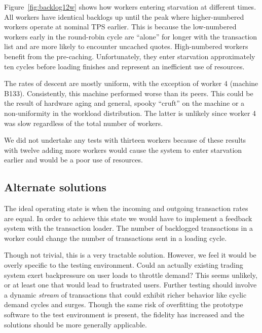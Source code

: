 Figure~\ref{fig:backlog12w} shows how workers entering starvation at different times.
All workers have identical backlogs up until the peak where higher-numbered workers operate at nominal TPS earlier.
This is because the low-numbered workers early in the round-robin cycle are ``alone'' for longer with the transaction list and are more likely to encounter uncached quotes.
High-numbered workers benefit from the pre-caching.
Unfortunately, they enter starvation approximately ten cycles before loading finishes and represent an inefficient use of resources.

The rates of descent are mostly uniform, with the exception of worker 4 (machine B133).
Consistently, this machine performed worse than its peers.
This could be the result of hardware aging and general, spooky ``cruft'' on the machine or a non-uniformity in the workload distribution.
The latter is unlikely since worker 4 was slow regardless of the total number of workers.

We did not undertake any tests with thirteen workers because of these results with twelve \textemdash{} adding more workers would cause the system to enter starvation earlier and would be a poor use of resources.

\subsection{Alternate solutions}
The ideal operating state is when the incoming and outgoing transaction rates are equal.
In order to achieve this state we would have to implement a feedback system with the transaction loader.
The number of backlogged transactions in a worker could change the number of transactions sent in a loading cycle.

Though not trivial, this is a very tractable solution.
However, we feel it would be overly specific to the testing environment.
Could an actually existing trading system exert backpressure on user loads to throttle demand? This seems unlikely, or at least one that would lead to frustrated users.
Further testing should involve a dynamic \textit{stream} of transactions that could exhibit richer behavior like cyclic demand cycles and surges.
Though the same risk of overfitting the prototype software to the test environment is present, the fidelity has increased and the solutions should be more generally applicable.
